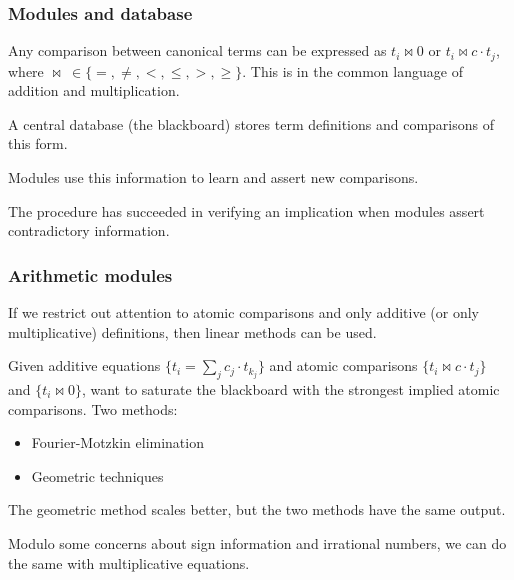 \documentclass{beamer}
\begin{document}
\begin{frame}
 \frametitle{Modules and database}
 Any comparison between canonical terms can be expressed as $t_i \bowtie 0$ or $t_i \bowtie c \cdot t_j$, where $\bowtie\ \in\{ =, \neq, <, \leq, >, \geq \}$. This is in the {common language} of addition and multiplication.
 
 \vspace{.5cm}
 
 A central database (the {blackboard}) stores term definitions and comparisons of this form.
 
 \vspace{.5cm}
 
 {Modules} use this information to learn and assert new comparisons.
 
 \vspace{.5cm}
 
 The procedure has succeeded in verifying an implication when modules assert contradictory information.
\end{frame}

\begin{frame}
 \frametitle{Arithmetic modules}
 If we restrict out attention to atomic comparisons and only additive (or only multiplicative) definitions, then linear methods can be used.
 
 \vspace{.5cm}
 
 Given additive equations $\{t_i = \sum_j c_j \cdot t_{k_j}\}$ and atomic comparisons $\{t_i \bowtie c \cdot t_j\}$ and $\{t_i \bowtie 0\}$, want to saturate the blackboard with the strongest implied atomic comparisons. Two methods:
 
 \begin{itemize}
  \item Fourier-Motzkin elimination
  \item Geometric techniques
 \end{itemize}
 
 The geometric method scales better, but the two methods have the same output.
 
 Modulo some concerns about sign information and irrational numbers, we can do the same with multiplicative equations.
\end{frame}
\end{document}
